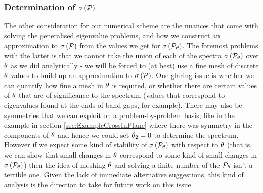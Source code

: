 \subsubsection{Determination of $\sigma\left( \mathcal{P} \right)$} \label{sec:ConcFutureGetSpectrum}
The other consideration for our numerical scheme are the nuances that come with solving the generalised eigenvalue problems, and how we construct an approximation to $\sigma\left( \mathcal{P} \right)$ from the values we get for $\sigma\left( \mathcal{P}_{\theta} \right)$.
The foremost problems with the latter is that we cannot take the union of each of the spectra $\sigma\left( \mathcal{P}_{\theta} \right)$ over $\theta$ as we did analytically - we will be forced to (at best) use a fine mesh of discrete $\theta$ values to build up an approximation to $\sigma\left( \mathcal{P} \right)$.
One glaring issue is whether we can quantify how fine a mesh in $\theta$ is required, or whether there are certain values of $\theta$ that are of significance to the spectrum (values that correspond to eigenvalues found at the ends of band-gaps, for example).
There may also be symmetries that we can exploit on a problem-by-problem basis; like in the example in section \ref{sec:ExampleCrossInPlane} where there was symmetry in the components of $\theta$ and hence we could set $\theta_2=0$ to determine the spectrum.
However if we expect some kind of stability of $\sigma\left( \mathcal{P}_{\theta} \right)$ with respect to $\theta$ (that is, we can show that small changes in $\theta$ correspond to some kind of small changes in $\sigma\left( \mathcal{P}_{\theta} \right)$) then the idea of meshing $\theta$ and solving a finite number of the $\mathcal{P}_{\theta}$ isn't a terrible one.
Given the lack of immediate alternative suggestions, this kind of analysis is the direction to take for future work on this issue. \newline

